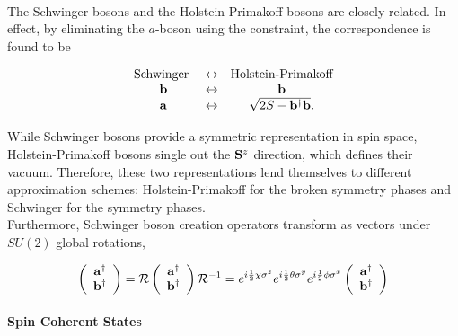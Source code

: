 \documentclass{homework}
\begin{document}
\blanky\\

The Schwinger bosons and the Holstein-Primakoff bosons are closely related. In effect, by eliminating the $a$-boson using the constraint, the correspondence is found to be 

\begin{equation}
    \begin{array}{ccc}
         \textnormal{Schwinger } & \leftrightarrow & \textnormal{Holstein-Primakoff} \\
         {\bf b} & \leftrightarrow & {\bf b}\\
         {\bf a} & \leftrightarrow & \sqrt{2S - {\bf b}^\dagger {\bf b}}.
    \end{array}
\end{equation}

While Schwinger bosons provide a symmetric representation in spin space, Holstein-Primakoff bosons single out the ${\bf S}^z$ direction, which defines their vacuum. Therefore, these two representations lend themselves to different approximation schemes: Holstein-Primakoff for the broken symmetry phases and Schwinger for the symmetry phases. \\

Furthermore, Schwinger boson creation operators transform as vectors under $SU(2)$ global rotations,

\begin{equation}
    \left(\begin{array}{c}
         {\bf a}^\dagger  \\
         {\bf b}^\dagger
    \end{array}\right) = \mathcal{R} \left(\begin{array}{c}
         {\bf a}^\dagger  \\
         {\bf b}^\dagger
    \end{array}\right) \mathcal{R}^{-1} = e^{i \frac{1}{2} \chi \sigma^z} e^{i \frac{1}{2} \theta \sigma^y} e^{i \frac{1}{2} \phi \sigma^x} \left(\begin{array}{c}
         {\bf a}^\dagger  \\
         {\bf b}^\dagger
    \end{array}\right)
    \label{Schwinger_bosons_are_su2vectors}
\end{equation}

\paragraph{Spin Coherent States}
\end{document}
